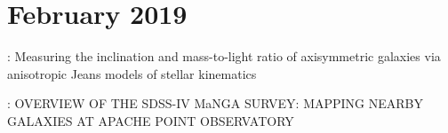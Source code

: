 \documentclass[ceqn,usenatbib,onecolumn]{mnras}
\begin{document}
\section{February 2019}
\citet{Cappellari2008} : {Measuring the inclination and mass-to-light ratio of
        axisymmetric galaxies via anisotropic Jeans models of stellar
        kinematics}
\par \citet{Bundy_2014} : {{OVERVIEW} {OF} {THE} {SDSS}-{IV} {MaNGA} {SURVEY}: {MAPPING} {NEARBY} {GALAXIES} {AT} {APACHE} {POINT} {OBSERVATORY}}



 
\end{document}
